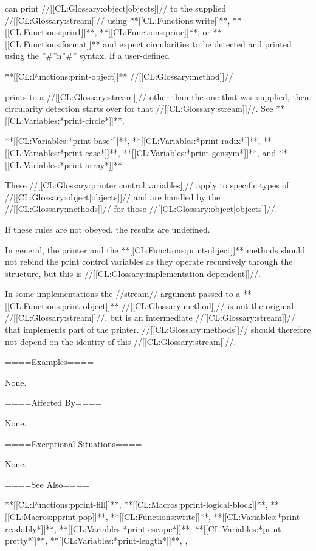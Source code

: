 can print //[[CL:Glossary:object|objects]]// to the supplied //[[CL:Glossary:stream]]// using **[[CL:Functions:write]]**, **[[CL:Functions:prin1]]**, **[[CL:Functions:princ]]**, or **[[CL:Functions:format]]** and expect circularities to be detected and printed using the ''#''n''#'' syntax. If a user-defined

**[[CL:Functions:print-object]]** //[[CL:Glossary:method]]//

prints to a //[[CL:Glossary:stream]]// other than the one that was supplied, then circularity detection starts over for that //[[CL:Glossary:stream]]//. See **[[CL:Variables:*print-circle*]]**.

\item{**[[CL:Variables:*print-base*]]**, **[[CL:Variables:*print-radix*]]**, **[[CL:Variables:*print-case*]]**, **[[CL:Variables:*print-gensym*]]**, and **[[CL:Variables:*print-array*]]**}

These //[[CL:Glossary:printer control variables]]// apply to specific types of //[[CL:Glossary:object|objects]]// and are handled by the //[[CL:Glossary:methods]]// for those //[[CL:Glossary:object|objects]]//.

\endlist

If these rules are not obeyed, the results are undefined.


In general, the printer and the **[[CL:Functions:print-object]]** methods should not rebind the print control variables as they operate recursively through the structure, but this is //[[CL:Glossary:implementation-dependent]]//.

In some implementations the //stream// argument passed to a **[[CL:Functions:print-object]]** //[[CL:Glossary:method]]// is not the original //[[CL:Glossary:stream]]//, but is an intermediate //[[CL:Glossary:stream]]// that implements part of the printer. //[[CL:Glossary:methods]]// should therefore not depend on the identity of this //[[CL:Glossary:stream]]//.




====Examples====

None.

====Affected By====

None.

====Exceptional Situations====

None.

====See Also====

**[[CL:Functions:pprint-fill]]**, **[[CL:Macros:pprint-logical-block]]**, **[[CL:Macros:pprint-pop]]**, **[[CL:Functions:write]]**, **[[CL:Variables:*print-readably*]]**, **[[CL:Variables:*print-escape*]]**, **[[CL:Variables:*print-pretty*]]**, **[[CL:Variables:*print-length*]]**, {\secref\DefaultPrintObjMeths},


